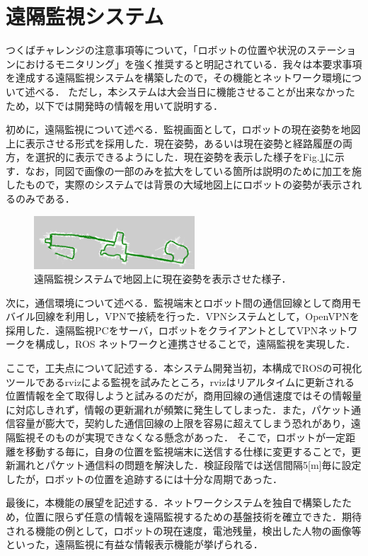 \documentclass[10pt,a4paper]{jarticle}
\begin{document}
\section{遠隔監視システム}
つくばチャレンジの注意事項等について，「ロボットの位置や状況のステーションにおけるモニタリング」を強く推奨すると明記されている．我々は本要求事項を達成する遠隔監視システムを構築したので，その機能とネットワーク環境について述べる．
ただし，本システムは大会当日に機能させることが出来なかったため，以下では開発時の情報を用いて説明する．

初めに，遠隔監視について述べる．監視画面として，ロボットの現在姿勢を地図上に表示させる形式を採用した．現在姿勢，あるいは現在姿勢と経路履歴の両方，を選択的に表示できるようにした．現在姿勢を表示した様子をFig.\ref{monitor}に示す．なお，同図で画像の一部のみを拡大をしている箇所は説明のために加工を施したもので，実際のシステムでは背景の大域地図上にロボットの姿勢が表示されるのみである．
\begin{figure}
    \centering
    \includegraphics[width=6cm]{fig/png/monitor.png}
    \caption{遠隔監視システムで地図上に現在姿勢を表示させた様子．}
    \label{monitor}
\end{figure}

次に，通信環境について述べる．監視端末とロボット間の通信回線として商用モバイル回線を利用し，VPNで接続を行った．VPNシステムとして，OpenVPNを採用した．遠隔監視PCをサーバ，ロボットをクライアントとしてVPNネットワークを構成し，ROS ネットワークと連携させることで，遠隔監視を実現した．

ここで，工夫点について記述する．本システム開発当初，本構成でROSの可視化ツールであるrvizによる監視を試みたところ，rvizはリアルタイムに更新される位置情報を全て取得しようと試みるのだが，商用回線の通信速度ではその情報量に対応しきれず，情報の更新漏れが頻繁に発生してしまった．また，パケット通信容量が膨大で，契約した通信回線の上限を容易に超えてしまう恐れがあり，遠隔監視そのものが実現できなくなる懸念があった．
そこで，ロボットが一定距離を移動する毎に，自身の位置を監視端末に送信する仕様に変更することで，更新漏れとパケット通信料の問題を解決した．検証段階では送信間隔5[m]毎に設定したが，ロボットの位置を追跡するには十分な周期であった．

最後に，本機能の展望を記述する．ネットワークシステムを独自で構築したため，位置に限らず任意の情報を遠隔監視するための基盤技術を確立できた．期待される機能の例として，ロボットの現在速度，電池残量，検出した人物の画像等といった，遠隔監視に有益な情報表示機能が挙げられる．
\end{document}
